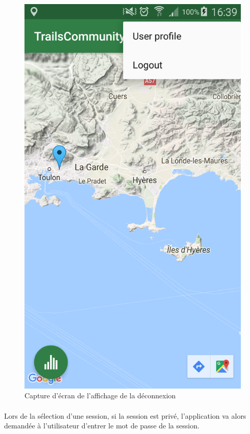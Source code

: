 \documentclass[titlepage, 12pt]{report}
\begin{document}
\begin{figure}[!h]
	\caption{Capture d'écran de l'affichage de la déconnexion}
	\label{screenshots_logout}
	\centering
	\includegraphics[scale=0.2]{Images/screenshots/logout.png}
\end{figure}

\clearpage

\paragraph{}Lors de la sélection d'une session, si la session est privé, l'application va alors demandée à l'utilisateur d'entrer le mot de passe de la session.
\end{document}
